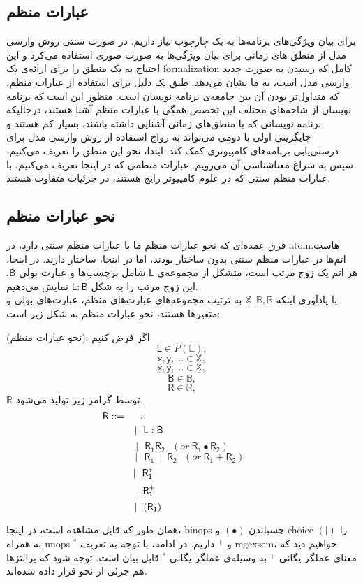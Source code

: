 \subsection{عبارات منظم}
برای بیان ویژگی‌های برنامه‌ها به یک چارچوب نیاز داریم. در صورت سنتی روش وارسی مدل از منطق های زمانی برای بیان ویژگی‌ها به صورت صوری استفاده می‌کرد و این احتیاج به یک منطق را برای ارائه‌ی یک \gls*{formalization} کامل که رسیدن به صورت جدید وارسی مدل است، به ما نشان می‌دهد. طبق \cite{calcul} یک دلیل برای استفاده از عبارات منظم، که متداول‌تر بودن آن بین جامعه‌ی برنامه نویسان است. منظور این است که برنامه نویسان از شاخه‌های مختلف این تخصص همگی با عبارات منظم آشنا هستند، درحالیکه برنامه نویسانی که با منطق‌های زمانی آشنایی داشته باشند، بسیار کم هستند و جایگزینی اولی با دومی می‌تواند به رواج استفاده از روش وارسی مدل برای درستی‌یابی برنامه‌های کامپیوتری کمک کند. ابتدا، نحو این منطق را تعریف می‌کنیم، سپس به سراغ معناشناسی آن می‌رویم. عبارات منظمی که در اینجا تعریف می‌کنیم، با عبارات منظم سنتی که در علوم کامپیوتر رایج هستند، در جزئیات متفاوت هستند. 
\subsection{نحو عبارات منظم}
فرق عمده‌ای که نحو عبارات منظم ما با عبارات منظم سنتی دارد، در \gls{atom}هاست. اتم‌ها در عبارات منظم سنتی بدون ساختار بودند، اما در اینجا، ساختار دارند. در اینجا، هر اتم یک زوج مرتب است، متشکل از مجموعه‌ی $\mathsf{L}$ شامل برچسب‌ها و عبارت بولی $\mathsf{B}$. این زوج مرتب را به شکل 
$\mathsf{L : B}$
نمایش می‌دهیم.\\ 
با یادآوری اینکه 
$\mathbb{X,B,R}$
به ترتیب مجموعه‌های عبارت‌های منظم، عبارت‌های بولی و متغیرها هستند، نحو عبارات منظم به شکل زیر است:
\begin{defn}
	(نحو عبارات منظم): اگر فرض کنیم
$$\mathsf{L} \in \mathit{P}(\mathbb{L}),$$        
$$\mathsf{x,y,...} \in \mathbb{X},$$
$$\mathsf{\underline{x},\underline{y},...} \in \mathbb{\underline{X}},$$
$$\mathsf{B} \in \mathbb{B},$$
$$\mathsf{R} \in \mathbb{R},$$
$\mathbb{R}$ توسط گرامر زیر تولید می‌شود.
$$\mathsf{R} ::=\hspace{0.5cm} \varepsilon\hspace{4.2cm}$$
$$|\:\:\:\mathsf{L : B}\hspace{2.4cm}$$
$$|\:\:\:\mathsf{R_1 R_2}\:\:\:(or\:\mathsf{R_1 \bullet R_2 })$$
$$\:\:\:\:\:\:\:|\:\:\:\mathsf{R_1\:\mid\:R_2}\:\:\:(or\:\mathsf{R_1 + R_2 })$$
$$|\:\:\:\mathsf{R_1^*}\hspace{2.8cm}$$
$$|\:\:\:\mathsf{R_1^+}\hspace{2.7cm}$$
$$|\:\:\:(\mathsf{R_1})\hspace{2.47cm}$$
\end{defn}
همان طور که قابل مشاهده است، در اینجا، \glspl*{binop} چسباندن
$(\bullet)$
 و \gls{choice}
$(|)$
 را به همراه \glspl*{unop}
$^*$
و
$^+$
داریم.
در ادامه، با توجه به تعریف \gls{regexsem}، خواهیم دید که معنای عملگر یگانی 
$^+$
به وسیله‌ی عملگر یگانی $^*$ قابل بیان است.
توجه شود که پرانتزها هم جزئی از نحو قرار داده شده‌اند.


